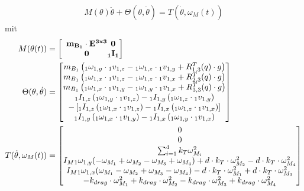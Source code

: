 \begin{align}
  M(\theta) \ddot\theta + \Theta (\theta, \dot \theta) = T(\dot \theta, \omega_M(t))
\end{align}
mit 
\begin{align}
M(\theta(t)) &= 
  \left[ 
      \begin{array}{c@{}c@{}}
          \mathbf{m_{B_1} \cdot E^{3x3}} & \mathbf{0} \\
          \mathbf{0} & \mathbf{{_{1}I_{1}}}\\
      \end{array}
  \right]\\
\Theta(\theta, \dot \theta ) &=
    \left[
      \begin{matrix}
        m_{B_1} \left( {_{1}} \omega_{1, y} \cdot {_{1}} v_{1, z} -  {_{1}} \omega_{1, z} \cdot {_{1}} v_{1, y} + R_{1, 3}^T(q) \cdot g \right)\\
        m_{B_1} \left( {_{1}} \omega_{1, x} \cdot {_{1}} v_{1, z} -  {_{1}} \omega_{1, z} \cdot {_{1}} v_{1, x} + R_{2, 3}^T(q) \cdot g \right)\\
        m_{B_1} \left( {_{1}} \omega_{1, x} \cdot {_{1}} v_{1, y} -  {_{1}} \omega_{1, y} \cdot {_{1}} v_{1, x} + R_{3, 3}^T(q) \cdot g \right)\\
        {_{1}I_{1, z}}  \left( {_{1}} \omega_{1, y} \cdot {_{1}} v_{1, z}\right) -  {_{1}I_{1, y}} \left({_{1}} \omega_{1, z} \cdot {_{1}} v_{1, y}  \right)\\
        -\left[{_{1}I_{1, z}}  \left( {_{1}} \omega_{1, x} \cdot {_{1}} v_{1, z}\right) -  {_{1}I_{1, x}} \left({_{1}} \omega_{1, z} \cdot {_{1}} v_{1, x} \right)\right]\\
        {_{1}I_{1, y}}  \left( {_{1}} \omega_{1, x} \cdot {_{1}} v_{1, y}\right) -  {_{1}I_{1, x}} \left({_{1}} \omega_{1, y} \cdot {_{1}} v_{1, x} \right)
      \end{matrix}
    \right]\\
    T(\dot\theta, \omega_M(t)) &= {\begin{bmatrix}  0 \\ 
                                                    0 \\ 
                                                    \sum_{i = 1}^4 k_{T} \omega^2_{M_i} \\
                                                    I_M {_{1}} \omega_{1, y} (- \omega_{M_1}+ \omega_{M_2} - \omega_{M_3} + \omega_{M_4}) + d \cdot k_{T} \cdot {\omega}^2_{M_2} - d \cdot k_{T} \cdot {\omega}^2_{M_4} \\
                                                    I_M {_{1}} \omega_{1, x} ( \omega_{M_1} - \omega_{M_2} + \omega_{M_3} - \omega_{M_4}) -d \cdot k_{T} \cdot {\omega}^2_{M_1} + d \cdot k_{T} \cdot {\omega}^2_{M_3} \\
                                                    -k_{drag} \cdot {\omega}^2_{M_1} + k_{drag} \cdot {\omega}^2_{M_2}  - k_{drag} \cdot {\omega}^2_{M_3} +  k_{drag} \cdot {\omega}^2_{M_4} 
                                   \end{bmatrix}}
\end{align}

